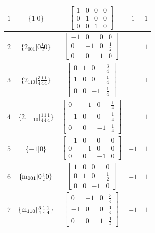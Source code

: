 \documentclass[fleqn,8pt]{jsarticle}
\begin{document}
\begin{longtable}{ccccc}
$ 1 $ & $ \{1|0\} $ & $ \begin{bmatrix} 1 & 0 & 0 & 0 \\ 0 & 1 & 0 & 0 \\ 0 & 0 & 1 & 0 \end{bmatrix} $ & $ 1 $ & $ 1 $ \\ \hline
$ 2 $ & $ \{2{}_{001}|0 \frac{1}{2} 0\} $ & $ \begin{bmatrix} -1 & 0 & 0 & 0 \\ 0 & -1 & 0 & \frac{1}{2} \\ 0 & 0 & 1 & 0 \end{bmatrix} $ & $ 1 $ & $ 1 $ \\ \hline
$ 3 $ & $ \{2{}_{110}|\frac{3}{4} \frac{1}{4} \frac{1}{4}\} $ & $ \begin{bmatrix} 0 & 1 & 0 & \frac{3}{4} \\ 1 & 0 & 0 & \frac{1}{4} \\ 0 & 0 & -1 & \frac{1}{4} \end{bmatrix} $ & $ 1 $ & $ 1 $ \\ \hline
$ 4 $ & $ \{2{}_{1-10}|\frac{1}{4} \frac{1}{4} \frac{1}{4}\} $ & $ \begin{bmatrix} 0 & -1 & 0 & \frac{1}{4} \\ -1 & 0 & 0 & \frac{1}{4} \\ 0 & 0 & -1 & \frac{1}{4} \end{bmatrix} $ & $ 1 $ & $ 1 $ \\ \hline
$ 5 $ & $ \{-1|0\} $ & $ \begin{bmatrix} -1 & 0 & 0 & 0 \\ 0 & -1 & 0 & 0 \\ 0 & 0 & -1 & 0 \end{bmatrix} $ & $ -1 $ & $ 1 $ \\ \hline
$ 6 $ & $ \{{\rm m}_{001}|0 \frac{1}{2} 0\} $ & $ \begin{bmatrix} 1 & 0 & 0 & 0 \\ 0 & 1 & 0 & \frac{1}{2} \\ 0 & 0 & -1 & 0 \end{bmatrix} $ & $ -1 $ & $ 1 $ \\ \hline
$ 7 $ & $ \{{\rm m}_{110}|\frac{3}{4} \frac{1}{4} \frac{1}{4}\} $ & $ \begin{bmatrix} 0 & -1 & 0 & \frac{3}{4} \\ -1 & 0 & 0 & \frac{1}{4} \\ 0 & 0 & 1 & \frac{1}{4} \end{bmatrix} $ & $ -1 $ & $ 1 $ \\ \hline

\end{longtable}
\end{document}
